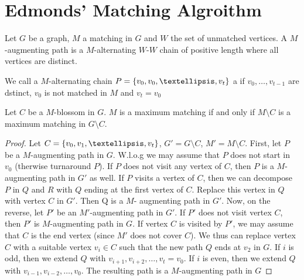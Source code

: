 \begin{lec}[2011-11-21]\end{lec}

\section*{Edmonds' Matching Algroithm}
Let $G$ be a graph, $M$ a matching in $G$ and $W$ the set of unmatched vertices.
A $M$-augmenting path is a $M$-alternating $W$-$W$ chain of positive length 
where all vertices are distinct.

We call a $M$-alternating chain $P=\plainset{v_0, v_0, …, v_t}$ a 
if $v_0, …, v_{t-1}$ are dstinct, $v_0$ is not matched in $M$ and $v_t = v_0$



\begin{thm}
	Let $C$  be a $M$-blossom in $G$. $M$ is a maximum matching if and only if 
	$M \setminus C$ is a maximum matching in $G \setminus C$.
\end{thm}

\begin{proof}
	Let $C = \plainset{v_0, v_1, …, v_t}$, $G' = G\setminus C$, $M' = M \setminus C$.
	First, let $P$ be a $M$-augmenting path in $G$.
	W.l.o.g we may assume that $P$ does not start in $v_0$ (therwise turnaround
	$P$).
	If $P$ does not visit any vertex of $C$, then $P$ is a $M$-augmenting
	path in $G'$ as well.
	If $P$ visits a vertex of $C$, then we can decompose $P$ in $Q$ and $R$
	with $Q$ ending at the first vertex of $C$.
	Replace this vertex in $Q$ with vertex $C$ in $G'$. Then Q is a $M$-
	augmenting path in $G'$.
	Now, on the reverse, let $P'$ be an $M'$-augmenting path in $G'$.
	If $P'$ does not visit vertex $C$, then $P'$ is $M$-augmenting path in $G$.
	If vertex $C$ is visited by $P'$, we may assume that $C$ is the end
	vertex (since $M'$ does not cover $C$). We thus can replace vertex $C$
	with a suitable vertex $v_i \in C$ such that the new path $Q$ ends at
	$v_2$ in $G$.
	If $i$ is odd, then we extend $Q$ with $v_{i+1}, v_{i+2}, …, v_t = v_0$.
	If $i$ is even, then we extend $Q$ with $v_{i-1}, v_{i-2}, …, v_0$.
	The resulting path is a $M$-augmenting path in $G$
\end{proof}
